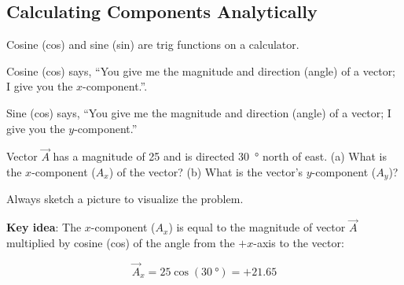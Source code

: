 \documentclass[main-physics.tex]{subfiles}
\begin{document}
\subsection{Calculating Components Analytically}

Cosine (cos) and sine (sin) are trig functions on a calculator.

Cosine (cos) says, ``You give me the magnitude and direction (angle) of a vector; I give you the $x$-component.''.

Sine (cos) says, ``You give me the magnitude and direction (angle) of a vector; I give you the $y$-component.''

\begin{example}
    Vector $\vec{A}$ has a magnitude of 25 and is directed \SI{30}{\degree} north of east. (a) What is the $x$-component ($A_x$) of the vector? (b) What is the vector's $y$-component ($A_y$)?
\end{example}

\Solution Always sketch a picture to visualize the problem.

\begin{figure}[h!]
    \centering
\def\A{5}
\def\angle{30}
\end{figure}

\textbf{Key idea}: The $x$-component ($A_x$) is equal to the magnitude of vector $\vec{A}$ multiplied by cosine (cos) of the angle from the $+x$-axis to the vector:

\begin{equation*}
    \vec{A}_x = 25 \cos{(\SI{30}{\degree})} = +21.65
\end{equation*}
\end{document}
